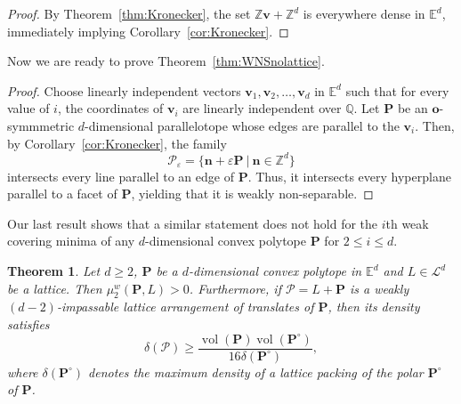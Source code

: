 \documentclass[12pt]{article}
\newtheorem{thm}{Theorem}
\DeclareMathOperator{\vol}{vol}
\newcommand{\Ee}{{\mathbb E}}
\begin{document}
\begin{proof}
By Theorem~\ref{thm:Kronecker}, the set $\mathbb{Z} \mathbf{v} + \mathbb{Z}^d$ is everywhere dense in $\Ee^d$, immediately implying Corollary~\ref{cor:Kronecker}.
\end{proof}

Now we are ready to prove Theorem~\ref{thm:WNSnolattice}.

\begin{proof}
Choose linearly independent vectors $\mathbf{v}_1, \mathbf{v}_2,\ldots, \mathbf{v}_d$ in $\Ee^d$ such that for every value of $i$, the coordinates of $\mathbf{v}_i$ are linearly independent over $\mathbb{Q}$. Let $\mathbf{P}$ be an $\mathbf{o}$-symmmetric $d$-dimensional parallelotope whose edges are parallel to the $\mathbf{v}_i$. Then, by Corollary~\ref{cor:Kronecker}, the family
\[
\mathcal{P}_{\varepsilon} = \{ \mathbf{n} + \varepsilon \mathbf{P} \ | \ \mathbf{n} \in \mathbb{Z}^d \}
\]
intersects every line parallel to an edge of $\mathbf{P}$. Thus, it intersects every hyperplane parallel to a facet of $\mathbf{P}$, yielding that it is weakly non-separable.
\end{proof}

Our last result shows that a similar statement does not hold for the $i$th weak covering minima of any $d$-dimensional convex polytope $\mathbf{P}$ for $2\leq i\leq d$.
 
\begin{thm}
Let $d \geq 2$, $\mathbf{P}$ be a $d$-dimensional convex polytope in $\Ee^d$ and $L \in \mathcal{L}^d$ be a lattice. Then $\mu_2^w (\mathbf{P}, L) > 0$. Furthermore, if $\mathcal{P}=L+\mathbf{P}$ is a weakly $(d-2)$-impassable lattice arrangement of translates of $\mathbf{P}$, then its density satisfies
\[
\delta(\mathcal{P}) \geq \frac{\vol(\mathbf{P})\vol(\mathbf{P}^{\circ})}{16 \delta(\mathbf{P}^{\circ})},
\]
where $\delta(\mathbf{P}^{\circ})$ denotes the maximum density of a lattice packing of the polar $\mathbf{P}^{\circ}$ of $\mathbf{P}$.
\end{thm}
\end{document}
